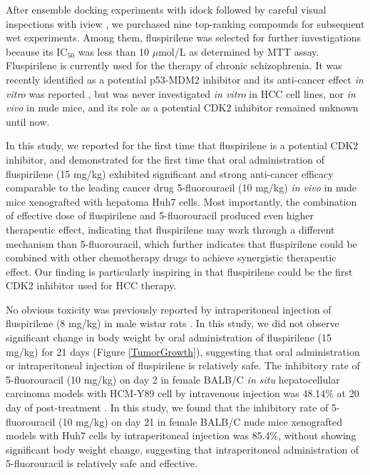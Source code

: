 \documentclass[10pt,letterpaper]{article}
\begin{document}
After ensemble docking experiments with idock \cite{1153,1362} followed by careful visual inspections with iview \cite{1366}, we purchased nine top-ranking compounds for subsequent wet experiments. Among them, fluspirilene was selected for further investigations because its IC$_{50}$ was less than 10 $\mu$mol/L as determined by MTT assay. Fluspirilene is currently used for the therapy of chronic schizophrenia. It was recently identified as a potential p53-MDM2 inhibitor and its anti-cancer effect \textit{in vitro} was reported \cite{1606}, but was never investigated \textit{in vitro} in HCC cell lines, nor \textit{in vivo} in nude mice, and its role as a potential CDK2 inhibitor remained unknown until now.

In this study, we reported for the first time that fluspirilene is a potential CDK2 inhibitor, and demonstrated for the first time that oral administration of fluspirilene (15 mg/kg) exhibited significant and strong anti-cancer efficacy comparable to the leading cancer drug 5-fluorouracil (10 mg/kg) \textit{in vivo} in nude mice xenografted with hepatoma Huh7 cells. Most importantly, the combination of effective dose of fluspirilene and 5-fluorouracil produced even higher therapeutic effect, indicating that fluspirilene may work through a different mechanism than 5-fluorouracil, which further indicates that fluspirilene could be combined with other chemotherapy drugs to achieve synergistic therapeutic effect. Our finding is particularly inspiring in that fluspirilene could be the first CDK2 inhibitor used for HCC therapy.

No obvious toxicity was previously reported by intraperitoneal injection of fluspirilene (8 mg/kg) in male wistar rats \cite{1610}. In this study, we did not observe significant change in body weight by oral administration of fluspirilene (15 mg/kg) for 21 days (Figure \ref{TumorGrowth}), suggesting that oral administration or intraperitoneal injection of fluspirilene is relatively safe. The inhibitory rate of 5-fluorouracil (10 mg/kg) on day 2 in female BALB/C \textit{in situ} hepatocellular carcinoma models with HCM-Y89 cell by intravenous injection was 48.14\% at 20 day of post-treatment \cite{1609}. In this study, we found that the inhibitory rate of 5-fluorouracil (10 mg/kg) on day 21 in female BALB/C nude mice xenografted models with Huh7 cells by intraperitoneal injection was 85.4\%, without showing significant body weight change, suggesting that intraperitoneal administration of 5-fluorouracil is relatively safe and effective.
\end{document}
